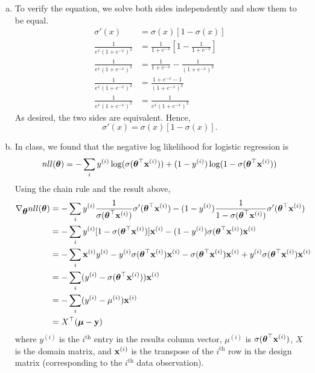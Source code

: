 \documentclass[12pt,letterpaper]{hmcpset}
\begin{document}
\begin{solution}

	\begin{enumerate}[(a)]
		\item 
		To verify the equation, we solve both sides independently and show them to 
		be equal.
		\begin{align*}
			\sigma'(x) &= \sigma(x)\left[1 - \sigma(x)\right] \\
			\frac{1}{e^x (1 + e^{-x})^2} &= 
				\frac{1}{1 + e^{-x}}[1 - \frac{1}{1 + e^{-x}}] \\
			\frac{1}{e^x (1 + e^{-x})^2} &= 
				\frac{1}{1 + e^{-x}}- \frac{1}{(1 + e^{-x})^2} \\
			\frac{1}{e^x (1 + e^{-x})^2} &= 
				\frac{1 + e^{-x} - 1}{(1 + e^{-x})^2} \\
			\frac{1}{e^x (1 + e^{-x})^2} &= 
				\frac{1}{e^x (1 + e^{-x})^2} 
		\end{align*}
		As desired, the two sides are equivalent. Hence,
		\[
			\sigma'(x) = \sigma(x)\left[1 - \sigma(x)\right].	
		\]

		\item
		In class, we found that the negative log likelihood for logistic regression is 
		\[
			nll(\hbox{\boldmath$\theta$}) = - \sum_i y^{(i)} \log( \sigma( \hbox{\boldmath$\theta$}^\top {\bf x}^{(i)}) ) 
				+ (1 - y^{(i)}) \log( 1 - \sigma( \hbox{\boldmath$\theta$}^\top {\bf x}^{(i)}) )
		\]
		Using the chain rule and the result above,
		\begin{align*}
			\nabla_{\hbox{\boldmath$\theta$}} nll(\hbox{\boldmath$\theta$}) &= - \sum_i y^{(i)} \frac{1}{\sigma( \hbox{\boldmath$\theta$}^\top {\bf x}^{(i)})}
				\sigma'( \hbox{\boldmath$\theta$}^\top {\bf x}^{(i)}) - (1 - y^{(i)}) 
				\frac{1}{1 - \sigma( \hbox{\boldmath$\theta$}^\top {\bf x}^{(i)})}
				\sigma'( \hbox{\boldmath$\theta$}^\top {\bf x}^{(i)}) \\
			&= - \sum_i y^{(i)} [1 - \sigma( \hbox{\boldmath$\theta$}^\top {\bf x}^{(i)})] {\bf x}^{(i)} - (1 	- y^{(i)}) \sigma( \hbox{\boldmath$\theta$}^\top {\bf x}^{(i)}) {\bf x}^{(i)} \\
			&= - \sum_i {\bf x}^{(i)}  y^{(i)} - y^{(i)} \sigma( \hbox{\boldmath$\theta$}^\top {\bf x}^{(i)}) {\bf x}^{(i)} - \sigma( \hbox{\boldmath$\theta$}^\top {\bf x}^{(i)}) {\bf x}^{(i)}  + y^{(i)} \sigma( \hbox{\boldmath$\theta$}^\top {\bf x}^{(i)}) {\bf x}^{(i)} \\
			&= - \sum_i (y^{(i)} - \sigma( \hbox{\boldmath$\theta$}^\top {\bf x}^{(i)})) {\bf x}^{(i)} \\
			&= - \sum_i (y^{(i)} - \mu^{(i)}) {\bf x}^{(i)} \\
			&= X^\top (\hbox{\boldmath$\mu$} - {\bf y})
		\end{align*}
		where $y^{(i)}$ is the $i^{\text{th}}$ entry in the results column vector, $\mu^{(i)}$ is $\sigma( \hbox{\boldmath$\theta$}^\top {\bf x}^{(i)})$, $X$ is the domain matrix, and ${\bf x}^{(i)}$ is the transpose of the $i^{\text{th}}$ row in the design matrix (corresponding to the $i^{\text{th}}$ data observation).


\end{enumerate}
\end{solution}
\end{document}

